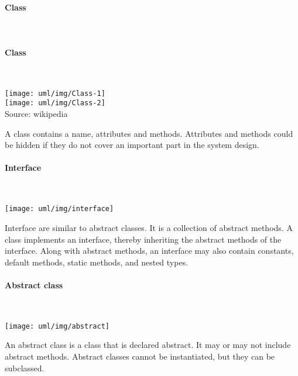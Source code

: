 \paragraph{Class}\\[2ex]
\begin{minipage}[c]{0.45\linewidth}
\else
\paragraph{Class}\mbox{} \\
\begin{minipage}[c]{0.5\linewidth}
\fi
\texttt{[image: uml/img/Class-1]}\\

\texttt{[image: uml/img/Class-2]}\\

%
{\footnotesize Source: wikipedia}
\end{minipage}
\hfill
\begin{minipage}[c]{0.45\linewidth}
A class contains a name, attributes and methods. Attributes and
methods could be hidden if they do not cover an important part in
the system design.
\end{minipage}
%
\paragraph{Interface}\mbox{} \\
\begin{minipage}[c]{0.28\linewidth}
\texttt{[image: uml/img/interface]}
\end{minipage}
\begin{minipage}[c]{0.7\linewidth}

Interface are similar to abstract classes.
It is a collection of abstract methods.
A class implements an interface, thereby inheriting
the abstract methods of the interface.
Along with abstract methods, an interface may also
contain constants, default methods, static methods,
and nested types.
\end{minipage}
%
\ifslides
\newpage
\fi
\paragraph{Abstract class}\mbox{} \\
\begin{minipage}[c]{0.28\linewidth}
\texttt{[image: uml/img/abstract]}
\end{minipage}
\begin{minipage}[c]{0.7\linewidth}
An abstract class is a class that is declared abstract. It
may or may not include abstract methods.
Abstract classes cannot be instantiated, but they can be subclassed.
\end{minipage}
%
\newpage
%

\end{minipage}
